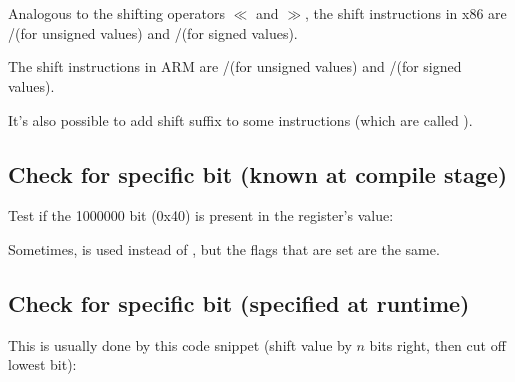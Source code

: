 ﻿%
\section{\Conclusion{}}


Analogous to the \CCpp shifting operators $\ll$ and $\gg$, 
the shift instructions in x86 are \SHR/\SHL (for unsigned values) and \SAR/\SHL (for signed values).


The shift instructions in ARM are \LSR/\LSL (for unsigned values) and \ASR/\LSL (for signed values).

It's also possible to add shift suffix to some instructions 
(which are called ).

\subsection{Check for specific bit (known at compile stage)}

Test if the 1000000 bit (0x40) is present in the register's value:










Sometimes, \AND is used instead of \TEST, but the flags that are set are the same.

\subsection{Check for specific bit (specified at runtime)}

This is usually done by this \CCpp code snippet (shift value by $n$ bits right, then cut off lowest bit):



